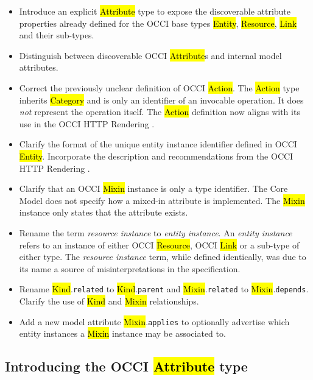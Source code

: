 \documentclass[10pt,a4paper]{article}
\begin{document}
\begin{itemize}
\item Introduce an explicit \hl{Attribute} type to expose the discoverable
  attribute properties already defined for the OCCI base types \hl{Entity},
  \hl{Resource}, \hl{Link} and their sub-types.

\item Distinguish between discoverable OCCI \hl{Attribute}s and internal model
  attributes.

\item Correct the previously unclear definition of OCCI \hl{Action}. The
  \hl{Action} type inherits \hl{Category} and is only an identifier of
  an invocable operation. It does {\em not} represent the operation itself.
  The \hl{Action} definition now aligns with its use in the OCCI HTTP Rendering
  \cite{occi:http_rendering}.

\item Clarify the format of the unique entity instance identifier defined in
  OCCI \hl{Entity}. Incorporate the description and recommendations from the
  OCCI HTTP Rendering \cite{occi:http_rendering}.

\item Clarify that an OCCI \hl{Mixin} instance is only a type identifier. The
  Core Model does not specify how a mixed-in attribute is implemented. The
  \hl{Mixin} instance only states that the attribute exists.

\item Rename the term {\em resource instance} to {\em entity instance}.
  An {\em entity instance} refers to an instance of either OCCI \hl{Resource},
  OCCI \hl{Link} or a sub-type of either type. The {\em resource instance}
  term, while defined identically, was due to its name a source of
  misinterpretations in the specification.

\item Rename \hl{Kind}.{\tt related} to \hl{Kind}.{\tt parent} and
  \hl{Mixin}.{\tt related} to \hl{Mixin}.{\tt depends}. Clarify the use
  of \hl{Kind} and \hl{Mixin} relationships.

\item Add a new model attribute \hl{Mixin}.{\tt applies} to optionally
  advertise which entity instances a \hl{Mixin} instance may be associated to.
\end{itemize}

\subsection{Introducing the OCCI \hl{Attribute} type}
\end{document}
